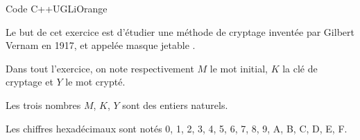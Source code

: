 \documentclass[a4paper,10pt]{book}
\begin{document}
\begin{enumerate}[\bfseries 1.]
\begin{encadrecolore}{Code C++}{UGLiOrange}
\end{encadrecolore}

\end{enumerate}


Le but de cet exercice est d'étudier une méthode de cryptage inventée par Gilbert Vernam en 1917, et appelée \og masque jetable \fg.

Dans tout l'exercice, on note respectivement $M$ le mot initial, $K$ la clé de cryptage et $Y$ le mot crypté.

Les trois nombres $M$, $K$, $Y$ sont des entiers naturels.

Les chiffres hexadécimaux sont notés 0, 1, 2, 3, 4, 5, 6, 7, 8, 9, A, B, C, D, E, F.

\medskip
\end{document}
